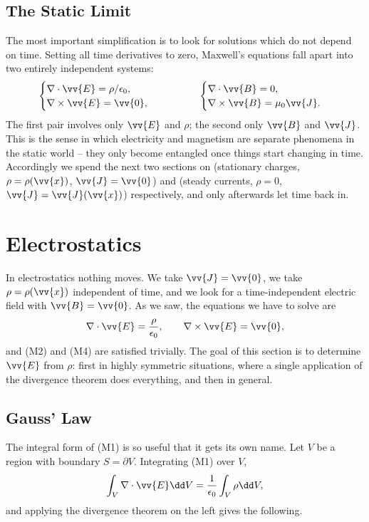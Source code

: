\subsection{The Static Limit}

The most important simplification is to look for solutions which do not depend on time. Setting all time derivatives to zero, Maxwell's equations fall apart into two entirely independent systems:
$$
\begin{cases}
	\nabla \cdot \vv{E} = \rho/\epsilon_0, \\
	\nabla \times \vv{E} = \vv{0},
\end{cases}
\qquad \qquad
\begin{cases}
	\nabla \cdot \vv{B} = 0, \\
	\nabla \times \vv{B} = \mu_0 \vv{J}.
\end{cases}
$$
The first pair involves only $\vv{E}$ and $\rho$; the second only $\vv{B}$ and $\vv{J}$. This is the sense in which electricity and magnetism are separate phenomena in the static world -- they only become entangled once things start changing in time. Accordingly we spend the next two sections on  (stationary charges, $\rho = \rho(\vv{x})$, $\vv{J} = \vv{0}$) and  (steady currents, $\rho = 0$, $\vv{J} = \vv{J}(\vv{x})$) respectively, and only afterwards let time back in.

\section{Electrostatics}

In electrostatics nothing moves. We take $\vv{J} = \vv{0}$, we take $\rho = \rho(\vv{x})$ independent of time, and we look for a time-independent electric field with $\vv{B} = \vv{0}$. As we saw, the equations we have to solve are
$$
\nabla \cdot \vv{E} = \frac{\rho}{\epsilon_0}, \qquad \nabla \times \vv{E} = \vv{0},
$$
and (M2) and (M4) are satisfied trivially. The goal of this section is to determine $\vv{E}$ from $\rho$: first in highly symmetric situations, where a single application of the divergence theorem does everything, and then in general.

\subsection{Gauss' Law}

The integral form of (M1) is so useful that it gets its own name. Let $V$ be a region with boundary $S = \partial V$. Integrating (M1) over $V$,
$$
\int_V \nabla \cdot \vv{E} \dd V = \frac{1}{\epsilon_0}\int_V \rho \dd V,
$$
and applying the divergence theorem on the left gives the following.

